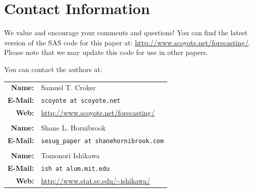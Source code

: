 \documentclass[10pt]{sugconf-ish}
\begin{document}



\newpage
\section{Contact Information}
We value and encourage your comments and questions! You can find the latest version of the SAS code for this paper at: \url{http://www.scoyote.net/forecasting/}. Please note that we may update this code for use in other papers.

You can contact the authors at:

\begin{tabular}[t]{rl}
\textbf{Name:} & Samuel T. Croker \\
\textbf{E-Mail:} & \texttt{scoyote at scoyote.net} \\
\textbf{Web:} & \url{http://www.scoyote.net/forecasting/} \\
 & \\
\textbf{Name:} & Shane L. Hornibrook \\
\textbf{E-Mail:} & \texttt{sesug\_paper at shanehornibrook.com} \\
 & \\
\textbf{Name:} & Tomonori Ishikawa \\
\textbf{E-Mail:} & \texttt{ish at alum.mit.edu} \\
\textbf{Web:} & \url{http://www.stat.sc.edu/~ishikawa/} \\
\end{tabular}


\vfill
\SASisRegisteredTrademark\ \OtherTrademarks
\end{document}
